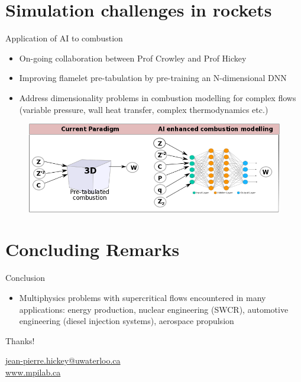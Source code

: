 \graphicspath{{../figs/}}

\section{Simulation challenges in  rockets}


\begin{frame}{Application of AI to combustion}
\begin{itemize}
\item On-going collaboration between Prof Crowley and  Prof Hickey 
\item Improving flamelet pre-tabulation by pre-training an N-dimensional DNN
\item Address dimensionality problems in combustion modelling for complex flows (variable pressure, wall heat transfer, complex thermodynamics etc.)
\end{itemize}
\begin{figure}
\includegraphics[width=\textwidth]{figs/AI_combustion.png}
\end{figure}
\end{frame}


\section{Concluding Remarks}
\begin{frame}{Conclusion}
\begin{itemize}
\item Multiphysics problems with supercritical flows encountered in many applications: energy production, nuclear engineering (SWCR), automotive engineering (diesel injection systems), aerospace propulsion
\end{itemize}
\end{frame}

\begin{frame}[c]{}
\begin{center}
{\LARGE{Thanks!}}\\
\vspace{0.8cm}

\url{jean-pierre.hickey@uwaterloo.ca}\\
\url{www.mpilab.ca}
\end{center}
\end{frame}

